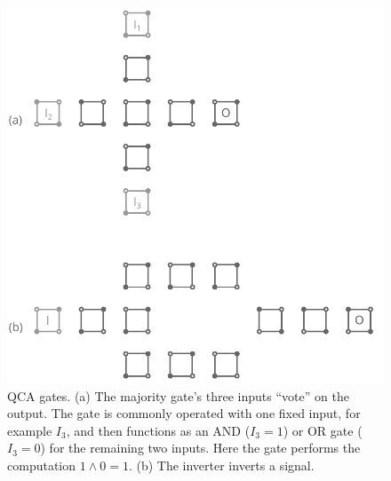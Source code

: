 \begin{figure}
  \center
  \includegraphics{gates}
  \caption{
QCA gates. (a) The majority gate's three inputs ``vote'' on the output. The gate
is commonly operated with one fixed input, for example $I_3$, and then functions
as an AND ($I_3 = 1$) or OR gate ($I_3 = 0$) for the remaining two inputs. Here
the gate performs the computation $1 \land 0 = 1$. (b) The inverter inverts a
signal.
}
  \label{fig:gates}
\end{figure}

